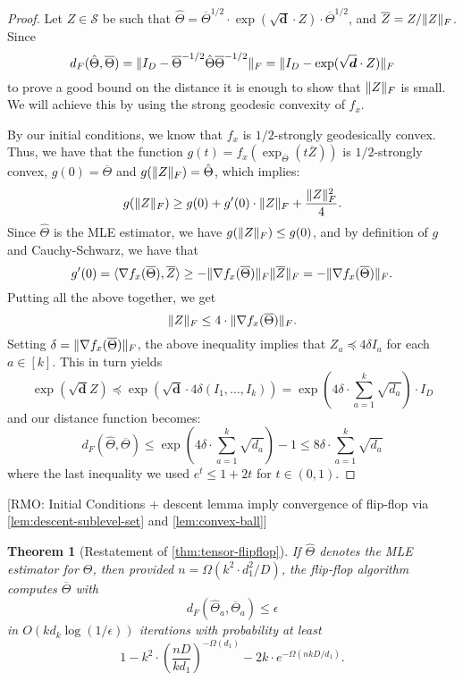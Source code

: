 \documentclass{article}
\newtheorem{theorem}{Theorem}
\DeclarePairedDelimiter{\norm}{\lVert}{\rVert}
\renewcommand{\vec}{\bm}
\newcommand{\otheta}{\overline{\Theta}}
\newcommand{\htheta}{\hat{\Theta}}
\newcommand{\oZ}{\overline{Z}}
\newcommand\Sym{\mathcal{S}}
\newcommand{\RMO}[1]{{\color{red}[RMO: #1]}}
\begin{document}
\begin{proof}
	Let $Z \in \Sym$ be such that $\htheta = \otheta^{1/2} \cdot \exp(\sqrt{\vec d} \cdot Z) \cdot \otheta^{1/2}$, and $\oZ = Z / \norm{Z}_F$.
	Since 
	$$ d_F(\htheta, \otheta) = \norm{I_D - \otheta^{-1/2} \htheta \otheta^{-1/2}}_F = \norm{I_D - \exp(\sqrt{\vec d} \cdot Z)}_F $$
	to prove a good bound on the distance it is enough to show that $\norm{Z}_F$ is small. 
	We will achieve this by using the strong geodesic convexity of $f_x$.
	
	By our initial conditions, we know that $f_x$ is $1/2$-strongly geodesically convex. 
	Thus, we have that the function $g(t) = f_x(\exp_{\otheta} (t \oZ) )$ is $1/2$-strongly convex, $g(0) = \otheta$ and $g(\norm{Z}_F) = \htheta$, which implies:
	$$ g(\norm{Z}_F) \geq g(0) + g'(0) \cdot \norm{Z}_F + \frac{\norm{Z}_F^2}{4}. $$
	Since $\htheta$ is the MLE estimator, we have $g(\norm{Z}_F) \leq g(0)$, and by definition of
	$g$ and Cauchy-Schwarz, we have that 
	$$ g'(0) = \langle \nabla f_x(\otheta), \oZ \rangle \geq - \norm{\nabla f_x(\otheta)}_F \norm{\oZ}_F = - \norm{\nabla f_x(\otheta)}_F. $$
	Putting all the above together, we get 
	$$ \norm{Z}_F \leq 4 \cdot \norm{\nabla f_x(\otheta)}_F. $$ 
	Setting $\delta = \norm{\nabla f_x(\otheta)}_F$, the above inequality implies that $Z_a \preceq 4 \delta I_a$ for each $a \in [k]$. This in turn yields 
	$$ \exp(\sqrt{\vec d} Z) \preceq \exp(\sqrt{\vec d} \cdot 4\delta (I_1, \dots, I_k)) = 
	\exp\left(4 \delta \cdot \sum_{a=1}^k \sqrt{d_a} \right) \cdot I_D $$
	and our distance function becomes:
	$$ d_F(\htheta, \otheta) \leq \exp\left(4 \delta \cdot \sum_{a=1}^k \sqrt{d_a} \right) - 1 \leq 8 \delta \cdot \sum_{a=1}^k \sqrt{d_a}  $$
	where the last inequality we used $e^t \leq 1 + 2t$ for $t \in (0,1)$.
\end{proof}

\RMO{Initial Conditions + descent lemma imply convergence of flip-flop via \cref{lem:descent-sublevel-set} and \cref{lem:convex-ball}}

\begin{theorem}[Restatement of \cref{thm:tensor-flipflop}]
	If $\htheta$ denotes the MLE estimator for $\Theta$, then provided $n = \Omega(k^2 \cdot d_1^2/D)$, the flip-flop algorithm computes $\otheta$ with 
	$$ d_F(\htheta_a, \otheta_a) \leq \epsilon $$
	in $O(k d_k \log(1/\epsilon))$ iterations with probability at least 
	$$ 1 - k^2 \cdot \left( \dfrac{nD}{k d_1} \right)^{-\Omega(d_1)} - 2k \cdot e^{- \Omega(nkD/d_1)}.$$
\end{theorem}
\end{document}
